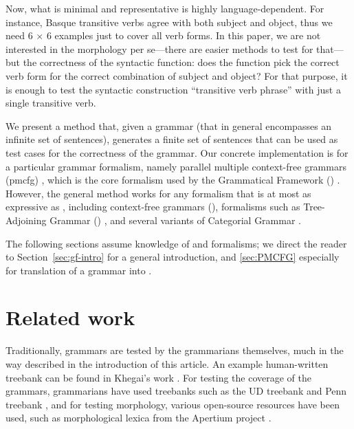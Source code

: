 Now, what is minimal and representative is highly language-dependent. 
For instance, Basque transitive verbs agree with both subject and
object, thus we need 6 $\times$ 6 examples just to cover all verb
forms. In this paper, we are not interested in the morphology per se---there are
easier methods to test for that---but the correctness of the syntactic
function: does the function pick the correct verb form for the correct
combination of subject and object? For that purpose, it is enough to
test the syntactic construction ``transitive verb phrase'' with just a
single transitive verb.

We present a method that, given a grammar (that in general encompasses
an infinite set of sentences), generates a finite set of sentences
that can be used as test cases for the correctness of the grammar. Our
concrete implementation is for a particular grammar formalism,
namely parallel multiple context-free grammars ({\sc pmcfg})
\cite{seki91pmcfg}, which is the core formalism used by the
Grammatical Framework (\gf) \cite{ranta2004gf}. However, the general
method works for any formalism that is at most as expressive as
\pmcfg{}, including context-free grammars (\cfg), formalisms such as Tree-Adjoining Grammar (\tag)
\cite{joshi1975tag}, and several variants of Categorial Grammar
\cite{deGroote2004,steedman1988ccg}.

The following sections assume knowledge of \gf{} and \pmcfg{}
formalisms; we direct the reader to Section~\ref{sec:gf-intro} for a
general \gf{} introduction, and \ref{sec:PMCFG} especially for
translation of a \gf{} grammar into \pmcfg{}.


\section{Related work}

Traditionally, \gf{} grammars are tested by the grammarians themselves,
much in the way described in the introduction of this article. An example
human-written treebank can be found in Khegai's work \cite[p.~136--142]{khegai2006phd}.
For testing the coverage of the grammars, grammarians have used
treebanks such as the UD treebank \cite{nivre2016ud} and Penn treebank
\cite{marcus1993penntreebank}, and for testing morphology, various open-source resources
have been used, such as morphological lexica from the Apertium
project \cite{forcada2011apertium}.



